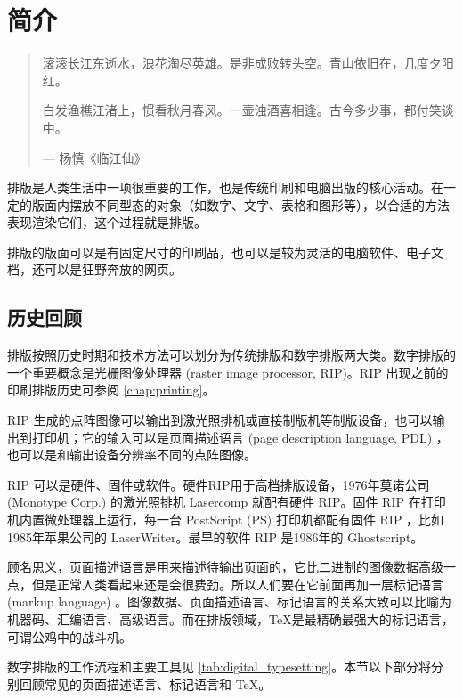 \chapter{简介}
\label{chap:introduction}

\begin{quotation}
滚滚长江东逝水，浪花淘尽英雄。是非成败转头空。青山依旧在，几度夕阳红。

白发渔樵江渚上，惯看秋月春风。一壶浊酒喜相逢。古今多少事，都付笑谈中。
\begin{flushright}
    --- 杨慎《临江仙》
\end{flushright}
\end{quotation}

排版是人类生活中一项很重要的工作，也是传统印刷和电脑出版的核心活动。在一定的版面内摆放不同型态的对象（如数字、文字、表格和图形等），以合适的方法表现渲染它们，这个过程就是排版。

排版的版面可以是有固定尺寸的印刷品，也可以是较为灵活的电脑软件、电子文档，还可以是狂野奔放的网页。

\section{历史回顾}
\label{sec:digital_typesetting}

排版按照历史时期和技术方法可以划分为传统排版和数字排版两大类。数字排版的一个重要概念是光栅图像处理器 (raster image processor, RIP)。RIP 出现之前的印刷排版历史可参阅 \autoref{chap:printing}。

RIP 生成的点阵图像可以输出到激光照排机或直接制版机等制版设备，也可以输出到打印机；它的输入可以是页面描述语言 (page description language, PDL) ，也可以是和输出设备分辨率不同的点阵图像。

RIP 可以是硬件、固件或软件。硬件RIP用于高档排版设备，1976年莫诺公司 (Monotype Corp.)\indexMonotype{} 的激光照排机 Lasercomp 就配有硬件 RIP。固件 RIP 在打印机内置微处理器上运行，每一台 PostScript (PS) 打印机都配有固件 RIP ，比如1985年苹果公司\indexApple 的 LaserWriter。最早的软件 RIP 是1986年的 Ghostscript。

顾名思义，页面描述语言是用来描述待输出页面的，它比二进制的图像数据高级一点，但是正常人类看起来还是会很费劲。所以人们要在它前面再加一层标记语言 (markup language) 。图像数据、页面描述语言、标记语言的关系大致可以比喻为机器码、汇编语言、高级语言。而在排版领域，\TeX 是最精确最强大的标记语言，可谓公鸡中的战斗机。

数字排版的工作流程和主要工具见 \autoref{tab:digital_typesetting}。本节以下部分将分别回顾常见的页面描述语言、标记语言和 \TeX。

